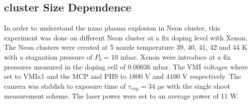 %

\subsection{cluster Size Dependence}

In order to understand the nano plasma explosion in Neon cluster, this experiment was done on different Neon cluster at a fix doping level with Xenon. The Neon clusters were created at 5 nozzle temperature 39, 40, 41, 42 and 44 K with a stagnation pressure of $P_{0}=10$ mbar. Xenon were introduce at a fix  pressures measured in the doping cell of 0.00036 mbar. The VMI voltages  where set to VMIx1  and the MCP and PHS to $1800$ V and $4100$ V respectively. The camera was stablish to exposure time of $\tau_{exp}=34$ $\mu$s   with the single shoot measurement scheme. The laser power were set to an average power of 11 W.

